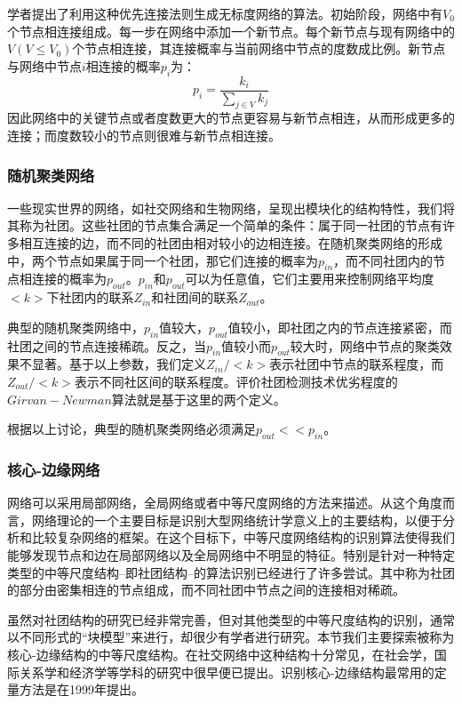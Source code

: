 \documentclass{ctexart}
\begin{document}
                学者提出了利用这种优先连接法则生成无标度网络的算法。初始阶段，网络中有$V_0$个节点相连接组成。每一步在网络中添加一个新节点。每个新节点与现有网络中的$V(V\le V_0)$个节点相连接，其连接概率与当前网络中节点的度数成比例。新节点与网络中节点$i$相连接的概率$p_i$为：
                \begin{equation}
                    p_i = \frac{k_i}{\sum_{j\in V} k_j}
                \end{equation}
                因此网络中的关键节点或者度数更大的节点更容易与新节点相连，从而形成更多的连接；而度数较小的节点则很难与新节点相连接。

            \subsubsection{随机聚类网络}
                一些现实世界的网络，如社交网络和生物网络，呈现出模块化的结构特性，我们将其称为社团。这些社团的节点集合满足一个简单的条件：属于同一社团的节点有许多相互连接的边，而不同的社团由相对较小的边相连接。在随机聚类网络的形成中，两个节点如果属于同一个社团，那它们连接的概率为$p_{in}$，而不同社团内的节点相连接的概率为$p_{out}$。$p_{in}$和$p_{out}$可以为任意值，它们主要用来控制网络平均度$<k>$下社团内的联系$Z_{in}$和社团间的联系$Z_{out}$。

                典型的随机聚类网络中，$p_{in}$值较大，$p_{out}$值较小，即社团之内的节点连接紧密，而社团之间的节点连接稀疏。反之，当$p_{in}$值较小而$p_{out}$较大时，网络中节点的聚类效果不显著。基于以上参数，我们定义$Z_{in}/<k>$表示社团中节点的联系程度，而$Z_{out}/<k>$表示不同社区间的联系程度。评价社团检测技术优劣程度的$Girvan-Newman$算法就是基于这里的两个定义。

                根据以上讨论，典型的随机聚类网络必须满足$p_{out} << p_{in}$。

            \subsubsection{核心-边缘网络}
                网络可以采用局部网络，全局网络或者中等尺度网络的方法来描述。从这个角度而言，网络理论的一个主要目标是识别大型网络统计学意义上的主要结构，以便于分析和比较复杂网络的框架。在这个目标下，中等尺度网络结构的识别算法使得我们能够发现节点和边在局部网络以及全局网络中不明显的特征。特别是针对一种特定类型的中等尺度结构--即社团结构--的算法识别已经进行了许多尝试。其中称为社团的部分由密集相连的节点组成，而不同社团中节点之间的连接相对稀疏。

                虽然对社团结构的研究已经非常完善，但对其他类型的中等尺度结构的识别，通常以不同形式的“块模型”来进行，却很少有学者进行研究。本节我们主要探索被称为核心-边缘结构的中等尺度结构。在社交网络中这种结构十分常见，在社会学，国际关系学和经济学等学科的研究中很早便已提出。识别核心-边缘结构最常用的定量方法是在1999年提出。
\end{document}
